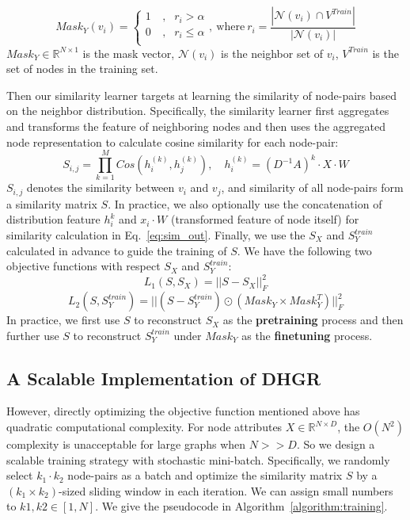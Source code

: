 \documentclass[sigconf]{acmart}
\begin{document}
	\begin{equation}
	\label{eq:mask}
	Mask_Y(v_i) = \left\{ 
	\begin{aligned}
	1 &\ , &  r_i > \alpha\\
	0 &\ , & r_i  \leq \alpha\\
	\end{aligned}
	\right.
	,\ \text{where}\ r_i=\frac{|\mathcal{N}(v_i)\cap V^{Train}|}{|\mathcal{N}(v_i)|}
	\end{equation}
	$Mask_Y\in\mathbb{R}^{N\times 1}$ is the mask vector, $\mathcal{N}(v_i)$ is the neighbor set of $v_i$, $V^{Train}$ is the set of nodes in the training set.
	
	Then our similarity learner targets at learning the  similarity of node-pairs based on the neighbor distribution. Specifically, the similarity learner first aggregates and transforms the feature of neighboring nodes and then uses the aggregated node representation to calculate cosine similarity for each node-pair:
	\begin{equation}
	\label{eq:sim_out}
	S_{i,j} = \prod_{k=1}^M Cos\left({h}_i^{(k)}, {h}_j^{(k)} \right), \quad h_i^{(k)} =  (D^{-1}A)^k\cdot X\cdot W
	\end{equation}
	$S_{i,j}$ denotes the similarity between $v_i$ and $v_j$, and similarity of all node-pairs form a similarity matrix $S$. In practice, we also optionally use the concatenation of distribution feature $h_i^{k}$ and  $x_i\cdot W$ (transformed feature of node itself) for similarity calculation in Eq.~\ref{eq:sim_out}. Finally, we use the  $S_X$ and $S_Y^{train}$ calculated in advance to guide the training of $S$. We have the following two objective functions with respect $S_X$ and $S_Y^{train}$:
	\begin{equation}
	\label{eq:loss_pretrain}
	L_{1}(S, S_X) = ||S-S_X||_F^2
	\end{equation}
	\begin{equation}
	\label{eq:loss_finetune}
	L_{2}(S, S_Y^{train}) = ||(S-S_Y^{train})\odot (Mask_Y\times Mask_Y^T)||_F^2
	\end{equation}
	In practice, we first use $S$ to reconstruct $S_X$ as the \textbf{pretraining} process and then further use $S$ to reconstruct $S_Y^{train}$ under $Mask_Y$ as the \textbf{finetuning} process. 
	\subsection{A Scalable Implementation of DHGR}
	However, directly optimizing the objective function mentioned above has quadratic computational complexity. For node attributes $X\in\mathbb{R}^{N\times D}$, the $O(N^2)$ complexity is unacceptable for large graphs when $N>>D$. So we design a scalable training strategy with stochastic mini-batch. Specifically, we randomly select $k_1\cdot k_2$ node-pairs as a batch and optimize the similarity matrix $S$ by a $(k_1\times k_2)$-sized sliding window in each iteration. We can assign small numbers to $k1, k2\in [1, N]$. We give the pseudocode in Algorithm~\ref{algorithm:training}.
	
\end{document}
